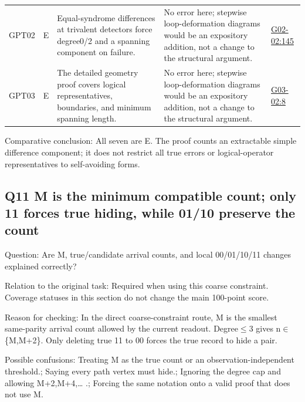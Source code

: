 \documentclass[11pt,a4paper]{article}
\begin{document}
{\begin{longtable}
{}GPT02 & E & Equal-syndrome differences at trivalent detectors force degree0/\allowbreak{}2 and a spanning component on failure. & No error here; stepwise loop-deformation diagrams would be an expository addition,\allowbreak{} not a change to the structural argument. & \hyperref[src:G02-02]{G02-02:145}\tabularnewline
{}GPT03 & E & The detailed geometry proof covers logical representatives,\allowbreak{} boundaries,\allowbreak{} and minimum spanning length. & No error here; stepwise loop-deformation diagrams would be an expository addition,\allowbreak{} not a change to the structural argument. & \hyperref[src:G03-02]{G03-02:8}\tabularnewline
\bottomrule
\end{longtable}
}
Comparative conclusion: All seven are E. The proof counts an extractable simple difference component; it does not restrict all true errors or logical-operator representatives to self-avoiding forms.

\clearpage
\subsection{Q11 M is the minimum compatible count; only 11 forces true hiding,\allowbreak{} while 01/\allowbreak{}10 preserve the count}
\label{aspect:Q11}
Question: Are M,\allowbreak{} true/\allowbreak{}candidate arrival counts,\allowbreak{} and local 00/\allowbreak{}01/\allowbreak{}10/\allowbreak{}11 changes explained correctly?

Relation to the original task: Required when using this coarse constraint. Coverage statuses in this section do not change the main 100-point score.

Reason for checking: In the direct coarse-constraint route,\allowbreak{} M is the smallest same-parity arrival count allowed by the current readout. Degree\ensuremath{\leq}3 gives n\ensuremath{\in}\{M,\allowbreak{}M+2\}. Only deleting true 11 to 00 forces the true record to hide a pair.

Possible confusions: Treating M as the true count or an observation-independent threshold.; Saying every path vertex must hide.; Ignoring the degree cap and allowing M+2,\allowbreak{}M+4,\allowbreak{}… .; Forcing the same notation onto a valid proof that does not use M.
\end{document}
